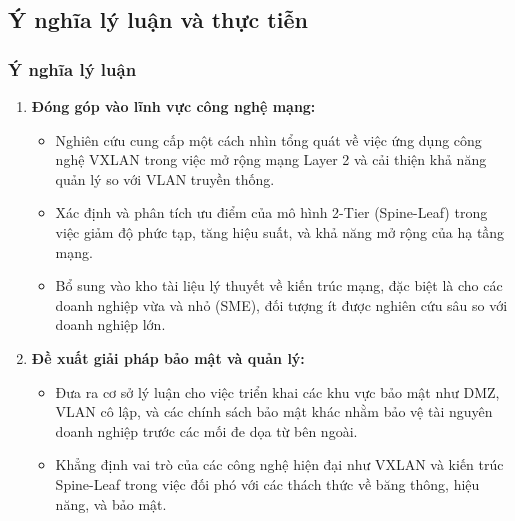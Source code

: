 \documentclass[13pt]{article}
\begin{document}
    \subsection{Ý nghĩa lý luận và thực tiễn}
    \subsubsection{Ý nghĩa lý luận}
    \begin{enumerate}
        \item \textbf{Đóng góp vào lĩnh vực công nghệ mạng:}
            \begin{itemize}
                \item Nghiên cứu cung cấp một cách nhìn tổng quát về việc ứng dụng công nghệ VXLAN trong việc mở rộng mạng Layer 2 và cải thiện khả năng quản lý so với VLAN truyền thống.
                \item Xác định và phân tích ưu điểm của mô hình 2-Tier (Spine-Leaf) trong việc giảm độ phức tạp, tăng hiệu suất, và khả năng mở rộng của hạ tầng mạng.
                \item Bổ sung vào kho tài liệu lý thuyết về kiến trúc mạng, đặc biệt là cho các doanh nghiệp vừa và nhỏ (SME), đối tượng ít được nghiên cứu sâu so với doanh nghiệp lớn.
            \end{itemize}
            
        \item \textbf{Đề xuất giải pháp bảo mật và quản lý:}
            \begin{itemize}
                \item Đưa ra cơ sở lý luận cho việc triển khai các khu vực bảo mật như DMZ, VLAN cô lập, và các chính sách bảo mật khác nhằm bảo vệ tài nguyên doanh nghiệp trước các mối đe dọa từ bên ngoài.
                \item Khẳng định vai trò của các công nghệ hiện đại như VXLAN và kiến trúc Spine-Leaf trong việc đối phó với các thách thức về băng thông, hiệu năng, và bảo mật.
            \end{itemize}
    \end{enumerate}
\end{document}
